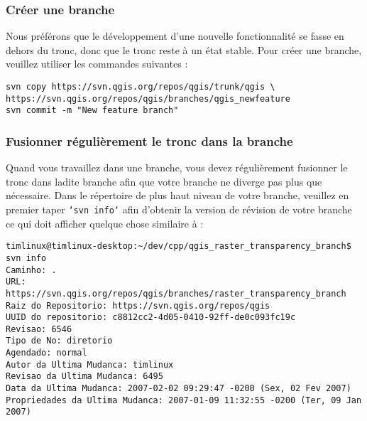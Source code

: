 \subsubsection{Créer une branche}
Nous préférons que le développement d'une nouvelle fonctionnalité se fasse en dehors du tronc, donc que le tronc reste à un état stable. Pour créer une branche, veuillez utiliser les commandes suivantes :
\begin{verbatim}
svn copy https://svn.qgis.org/repos/qgis/trunk/qgis \
https://svn.qgis.org/repos/qgis/branches/qgis_newfeature
svn commit -m "New feature branch"
\end{verbatim}


\subsubsection{Fusionner régulièrement le tronc dans la branche}
Quand vous travaillez dans une branche, vous devez régulièrement fusionner le tronc dans ladite branche afin que votre branche ne diverge pas plus que nécessaire. Dans le répertoire de plus haut niveau de votre branche, veuillez en premier taper \texttt{`svn info`} afin d'obtenir la version de révision de votre branche ce qui doit afficher quelque chose similaire à :

\begin{verbatim}
timlinux@timlinux-desktop:~/dev/cpp/qgis_raster_transparency_branch$ svn info
Caminho: .
URL: https://svn.qgis.org/repos/qgis/branches/raster_transparency_branch
Raiz do Repositorio: https://svn.qgis.org/repos/qgis
UUID do repositorio: c8812cc2-4d05-0410-92ff-de0c093fc19c
Revisao: 6546
Tipo de No: diretorio
Agendado: normal
Autor da Ultima Mudanca: timlinux
Revisao da Ultima Mudanca: 6495
Data da Ultima Mudanca: 2007-02-02 09:29:47 -0200 (Sex, 02 Fev 2007)
Propriedades da Ultima Mudanca: 2007-01-09 11:32:55 -0200 (Ter, 09 Jan 2007)
\end{verbatim}

